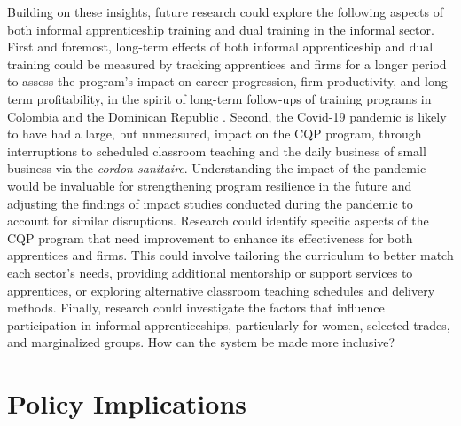 \documentclass[
  a4paper, twoside, 12pt]{book}
\renewcommand{\hl}[1]{#1}
\newcommand{\hlc}[2][color]{}
\begin{document}
\hl{Building on these insights, future research could explore the following aspects of both informal apprenticeship training and dual training in the informal sector. First and foremost, long-term effects of both informal apprenticeship and dual training could be measured by tracking apprentices and firms for a longer period to assess the program's impact on career progression, firm productivity, and long-term profitability, in the spirit of long-term follow-ups of training programs in Colombia} \autocite{attanasio2017}\hl{ and the Dominican Republic }\autocite{ibarraran2019}. \hl{Second, the Covid-19 pandemic is likely to have had a large, but unmeasured, impact on the CQP program, through interruptions to scheduled classroom teaching and the daily business of small business via the \textit{cordon sanitaire}. Understanding the impact of the pandemic would be invaluable for strengthening program resilience in the future and adjusting the findings of impact studies conducted during the pandemic to account for similar disruptions. Research could identify specific aspects of the CQP program that need improvement to enhance its effectiveness for both apprentices and firms. This could involve tailoring the curriculum to better match each sector's needs, providing additional mentorship or support services to apprentices, or exploring alternative classroom teaching schedules and delivery methods. Finally, research could investigate the factors that influence participation in informal apprenticeships, particularly for women, selected trades, and marginalized groups. How can the system be made more inclusive?}

\hypertarget{section-8}{%
\section{\texorpdfstring{\hl{Policy Implications}}{}}\label{section-8}}

\hlc[lightgray]{In the three chapters of this thesis, I provide evidence on cross-country and country-specific school-to-work transitions in low-income and informal labor market settings. I demonstrate that longitudinal data provides deep insights into the SWT, and that this data can be gathered at low cost and with relatively low drop-out rates with the help of remote surveys. I also show that dual system apprenticeship is a promising avenue for facilitating successful transitions to employment, in particular for youth who exit the formal education system early. The three chapters also articulate various policy responses to the youth employment crisis, which can be summarized in three cross-cutting recommendations.}
\end{document}
